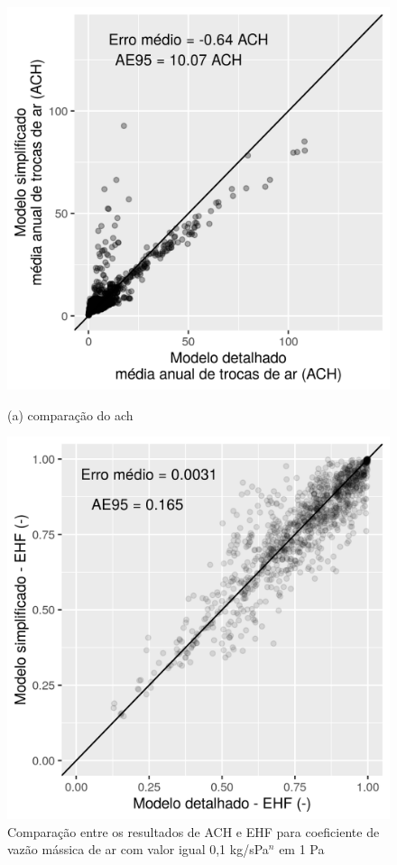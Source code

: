 \documentclass[brazil,hardcopy,openany]{ufscthesis} %
\begin{document}
\begin{figure}[h]
	\caption{Comparação entre os resultados de ACH e EHF para coeficiente de vazão mássica de ar com valor igual 0,1 kg/sPa$^n$ em 1 Pa}
	\begin{minipage}{.5\textwidth}
		\centering
		\includegraphics[width=1\linewidth]{img/cpeq_COM_10.png}
		\begin{center}
			\small{(a) comparação do \acrshort{ach}}
		\end{center}
	\end{minipage}%
	\begin{minipage}{.5\textwidth}
		\centering
		\includegraphics[width=1\linewidth]{img/cpeq_COM_10EHF.png}

\end{minipage}
\end{figure}
\end{document}
